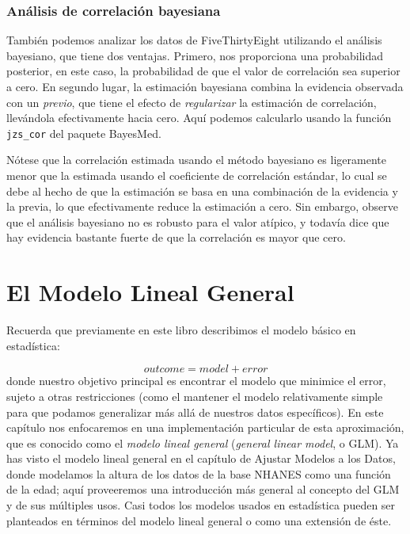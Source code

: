 \documentclass[
  12pt,
]{book}
\theoremstyle{definition}
\theoremstyle{definition}
\theoremstyle{definition}
\theoremstyle{remark}
\begin{document}
\hypertarget{anuxe1lisis-de-correlaciuxf3n-bayesiana}{%
\subsection{Análisis de correlación bayesiana}\label{anuxe1lisis-de-correlaciuxf3n-bayesiana}}

También podemos analizar los datos de FiveThirtyEight utilizando el análisis bayesiano, que tiene dos ventajas. Primero, nos proporciona una probabilidad posterior, en este caso, la probabilidad de que el valor de correlación sea superior a cero. En segundo lugar, la estimación bayesiana combina la evidencia observada con un \emph{previo}, que tiene el efecto de \emph{regularizar} la estimación de correlación, llevándola efectivamente hacia cero. Aquí podemos calcularlo usando la función \texttt{jzs\_cor} del paquete BayesMed.

Nótese que la correlación estimada usando el método bayesiano es ligeramente menor que la estimada usando el coeficiente de correlación estándar, lo cual se debe al hecho de que la estimación se basa en una combinación de la evidencia y la previa, lo que efectivamente reduce la estimación a cero. Sin embargo, observe que el análisis bayesiano no es robusto para el valor atípico, y todavía dice que hay evidencia bastante fuerte de que la correlación es mayor que cero.

\hypertarget{el-modelo-lineal-general}{%
\chapter{El Modelo Lineal General}\label{el-modelo-lineal-general}}

Recuerda que previamente en este libro describimos el modelo básico en estadística:

\[
outcome = model + error
\]
donde nuestro objetivo principal es encontrar el modelo que minimice el error, sujeto a otras restricciones (como el mantener el modelo relativamente simple para que podamos generalizar más allá de nuestros datos específicos). En este capítulo nos enfocaremos en una implementación particular de esta aproximación, que es conocido como el \emph{modelo lineal general} (\emph{general linear model}, o GLM). Ya has visto el modelo lineal general en el capítulo de Ajustar Modelos a los Datos, donde modelamos la altura de los datos de la base NHANES como una función de la edad; aquí proveeremos una introducción más general al concepto del GLM y de sus múltiples usos. Casi todos los modelos usados en estadística pueden ser planteados en términos del modelo lineal general o como una extensión de éste.
\end{document}
